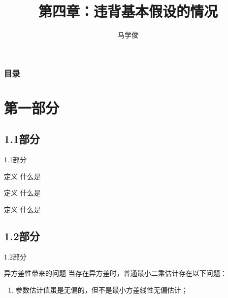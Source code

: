 \documentclass[10pt,CJKutf8]{beamer}
\begin{document}
\begin{CJK}{UTF8}{gbsn}

\title[应用回归分析]{第四章：违背基本假设的情况}   %


\author[马学俊]{马学俊}%
\date{}


\begin{frame}%
  \titlepage
\end{frame}



\begin{frame}

\frametitle{目录}
\tableofcontents

\end{frame}

\section{第一部分}
\subsection{1.1部分}
\begin{frame}{1.1部分}
\begin{alertblock}{定义}
什么是
\end{alertblock}

\begin{exampleblock}{定义}
什么是
\end{exampleblock}

\begin{block}{定义}
什么是
\end{block}

\end{frame}



\subsection{1.2部分}
\begin{frame}
1.2部分
\end{frame}

\begin{frame}{异方差性带来的问题}
当存在异方差时，普通最小二乘估计存在以下问题：
\begin{enumerate}[(1)]
  \item 参数估计值虽是无偏的，但不是最小方差线性无偏估计；
\end{enumerate}
\end{frame}


\end{CJK}
\end{document}
